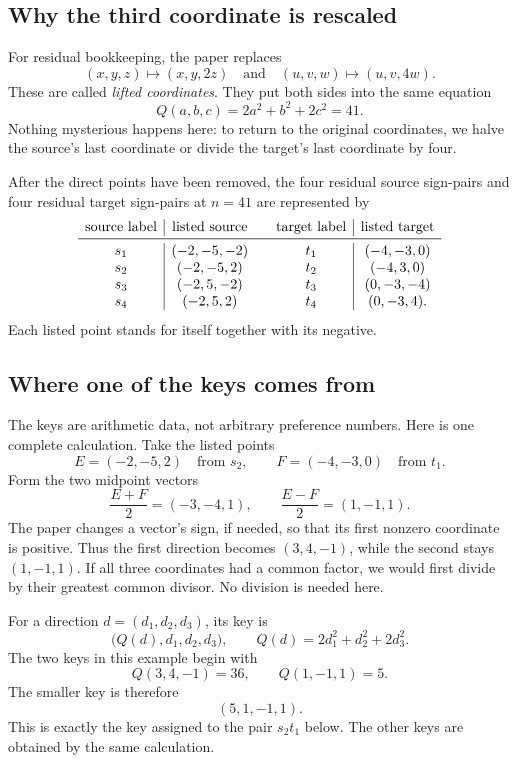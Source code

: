 \documentclass[11pt]{amsart}
\begin{document}
\subsection*{Why the third coordinate is rescaled}

For residual bookkeeping, the paper replaces
\[
 (x,y,z)\longmapsto(x,y,2z)
 \quad\text{and}\quad
 (u,v,w)\longmapsto(u,v,4w).
\]
These are called \emph{lifted coordinates}.  They put both sides into the
same equation
\[
 Q(a,b,c)=2a^2+b^2+2c^2=41.
\]
Nothing mysterious happens here: to return to the original coordinates, we
halve the source's last coordinate or divide the target's last coordinate by
four.

After the direct points have been removed, the four residual source
sign-pairs and four residual target sign-pairs at \(n=41\) are represented by
\[
\begin{array}{c|c@{\qquad}c|c}
\text{source label}&\text{listed source}&\text{target label}&\text{listed target}\\
\midrule
s_1&(-2,-5,-2)&t_1&(-4,-3,0)\\
s_2&(-2,-5, 2)&t_2&(-4, 3,0)\\
s_3&(-2, 5,-2)&t_3&(0,-3,-4)\\
s_4&(-2, 5, 2)&t_4&(0,-3, 4).
\end{array}
\]
Each listed point stands for itself together with its negative.

\subsection*{Where one of the keys comes from}

The keys are arithmetic data, not arbitrary preference numbers.  Here is one
complete calculation.  Take the listed points
\[
 E=(-2,-5,2)\quad\text{from }s_2,
 \qquad
 F=(-4,-3,0)\quad\text{from }t_1.
\]
Form the two midpoint vectors
\[
 \frac{E+F}{2}=(-3,-4,1),
 \qquad
 \frac{E-F}{2}=(1,-1,1).
\]
The paper changes a vector's sign, if needed, so that its first nonzero
coordinate is positive.  Thus the first direction becomes \((3,4,-1)\),
while the second stays \((1,-1,1)\).  If all three coordinates had a common
factor, we would first divide by their greatest common divisor.  No division
is needed here.

For a direction \(d=(d_1,d_2,d_3)\), its key is
\[
 \bigl(Q(d),d_1,d_2,d_3\bigr),
 \qquad
 Q(d)=2d_1^2+d_2^2+2d_3^2.
\]
The two keys in this example begin with
\[
 Q(3,4,-1)=36,
 \qquad
 Q(1,-1,1)=5.
\]
The smaller key is therefore
\[
 (5,1,-1,1).
\]
This is exactly the key assigned to the pair \(s_2t_1\) below.  The other
keys are obtained by the same calculation.
\end{document}
